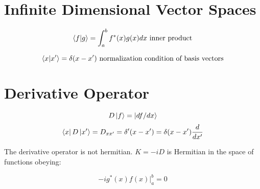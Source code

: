 \section{Infinite Dimensional Vector Spaces}

\begin{equation}
	\braket{f}{g} = \int_a^b f^*(x)g(x)dx \text{ inner product}
\end{equation}

\begin{equation}
	\braket{x}{x'} = \delta(x-x') \text{ normalization condition of basis vectors}
\end{equation}

\section{Derivative Operator}
\begin{equation}
	D\ket{f} = \ket{df/dx}
\end{equation}
\begin{equation}
	\bra{x}D\ket{x'} = D_{xx'} = \delta'(x-x') = \delta(x-x')\frac{d}{dx'}
\end{equation}

The derivative operator is not hermitian.  $K=-iD$ is Hermitian in the space of functions obeying:

\begin{equation}
	-ig^*(x)f(x)\bigg\rvert_a^b = 0
\end{equation}
